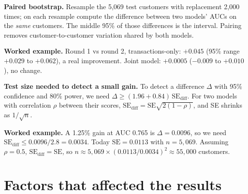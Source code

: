 \documentclass[10pt,a4paper]{article}
\newcommand{\ex}{\par\textbf{Worked example.} }
\begin{document}
\textbf{Paired bootstrap.} Resample the 5,069 test customers with replacement 2,000 times; on each resample compute the difference between two models' AUCs on the \emph{same} customers. The middle 95\% of those differences is the interval. Pairing removes customer-to-customer variation shared by both models.
\ex Round 1 vs round 2, transactions-only: $+0.045$ (95\% range $+0.029$ to $+0.062$), a real improvement. Joint model: $+0.0005$ ($-0.009$ to $+0.010$), no change.

\textbf{Test size needed to detect a small gain.} To detect a difference $\Delta$ with 95\% confidence and 80\% power, we need $\Delta\ge(1.96+0.84)\,\text{SE}_{\text{diff}}$. For two models with correlation $\rho$ between their scores, $\text{SE}_{\text{diff}}=\text{SE}\sqrt{2(1-\rho)}$, and SE shrinks as $1/\sqrt n$.
\ex A 1.25\% gain at AUC 0.765 is $\Delta=0.0096$, so we need $\text{SE}_{\text{diff}}\le0.0096/2.8=0.0034$. Today $\text{SE}=0.0113$ with $n=5{,}069$. Assuming $\rho=0.5$, $\text{SE}_{\text{diff}}=\text{SE}$, so $n\approx5{,}069\times(0.0113/0.0034)^2\approx55{,}000$ customers.

\part{Factors that affected the results}
\end{document}
